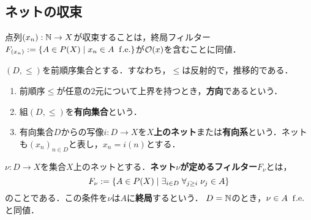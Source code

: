 \documentclass[uplatex,dvipdfmx]{jsreport}
\begin{document}
\subsection{ネットの収束}

\begin{tcolorbox}[colframe=ForestGreen, colback=ForestGreen!10!white,breakable,colbacktitle=ForestGreen!40!white,coltitle=black,fonttitle=\bfseries\sffamily,
title=]
    点列$(x_n):\mathbb{N}\to X$が収束することは，終局フィルター$F_{(x_n)}:=\left\{A\in P(X)\mid x_n\in A\;\;\mathrm{f.e.}\right\}$が$\mathcal{O}(x)$を含むことに同値．
\end{tcolorbox}

\begin{definition}
    $(D,\le)$を前順序集合とする．すなわち，$\le$は反射的で，推移的である．
    \begin{enumerate}
        \item 前順序$\le$が任意の2元について上界を持つとき，\textbf{方向}であるという．
        \item 組$(D,\le)$を\textbf{有向集合}という．
        \item 有向集合$D$からの写像$i:D\to X$を\textbf{$X$上のネット}または\textbf{有向系}という．ネットも$(x_n)_{n\in D}$と表し，$x_n=i(n)$とする．
    \end{enumerate}
\end{definition}

\begin{definition}
        $\nu:D\to X$を集合$X$上のネットとする．\textbf{ネット$\nu$が定めるフィルター}$F_\nu$とは，
        \[F_\nu:=\left\{A\in P(X)\mid \exists_{i\in D}\;\forall_{j\ge i}\;\nu_j\in A\right\}\]
        のことである．この条件を$\nu$は$A$に\textbf{終局}するという．
        $D=\mathbb{N}$のとき，$\nu\in A\;\;\mathrm{f.e.}$と同値．
\end{definition}
\end{document}
